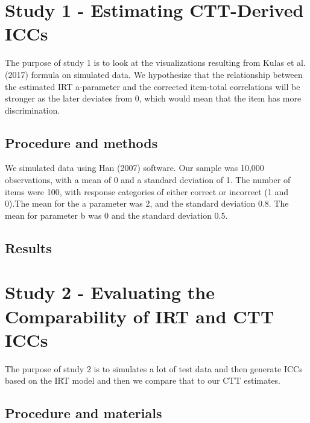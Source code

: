 \documentclass[
  english,
  man]{apa6}
\begin{document}
\hypertarget{study-1---estimating-ctt-derived-iccs}{%
\section{Study 1 - Estimating CTT-Derived ICCs}\label{study-1---estimating-ctt-derived-iccs}}

The purpose of study 1 is to look at the visualizations resulting from Kulas et al. (2017) formula on simulated data. We hypothesize that the relationship between the estimated IRT a-parameter and the corrected item-total correlations will be stronger as the later deviates from 0, which would mean that the item has more discrimination.

\hypertarget{procedure-and-methods}{%
\subsection{Procedure and methods}\label{procedure-and-methods}}

We simulated data using Han (2007) software. Our sample was 10,000 observations, with a mean of 0 and a standard deviation of 1. The number of items were 100, with response categories of either correct or incorrect (1 and 0).The mean for the a parameter was 2, and the standard deviation 0.8. The mean for parameter b was 0 and the standard deviation 0.5.

\hypertarget{results}{%
\subsection{Results}\label{results}}

\hypertarget{study-2---evaluating-the-comparability-of-irt-and-ctt-iccs}{%
\section{Study 2 - Evaluating the Comparability of IRT and CTT ICCs}\label{study-2---evaluating-the-comparability-of-irt-and-ctt-iccs}}

The purpose of study 2 is to simulates a lot of test data and then generate ICCs based on the IRT model and then we compare that to our CTT estimates.

\hypertarget{procedure-and-materials}{%
\subsection{Procedure and materials}\label{procedure-and-materials}}
\end{document}
